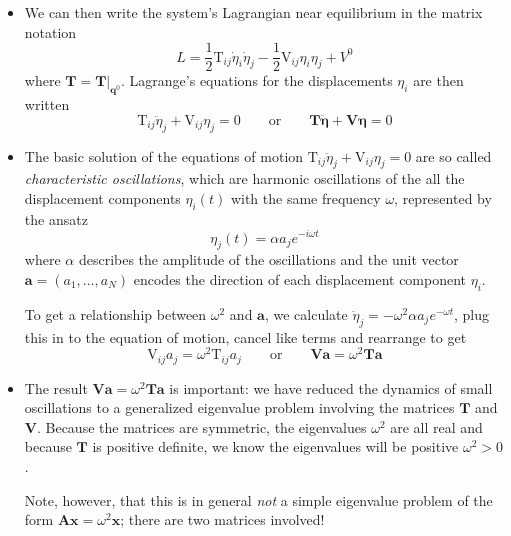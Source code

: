 \documentclass[11pt, a4paper]{article}
\newcommand{\eqtext}[1]{\qquad \text{#1} \qquad}
\newcommand{\bddot}[1]{\ddot{\bm{#1}}}
\newcommand{\mat}[1]{\mathbf{#1}}
\begin{document}
\begin{itemize}
	\item We can then write the system's Lagrangian near equilibrium in the matrix notation
	\begin{equation*}
		L = \frac{1}{2} \mathrm{T}_{ij}\dot{\eta}_{i}\dot{\eta}_{j} - \frac{1}{2}\mathrm{V}_{ij}\eta_{i}\eta_{j} + V^{0}
	\end{equation*}
	where $ \mat{T} = \mat{T}\big |_{\bm{q}^{0}} $. Lagrange's equations for the displacements $ \eta_{i} $ are then written
	\begin{equation*}
		\mathrm{T}_{ij} \ddot{\eta}_{j} + \mathrm{V}_{ij} \eta_{j} = 0 \eqtext{or} \mat{T} \bddot{\eta} + \mat{V} \bm{\eta} =0
	\end{equation*}
	
	\item The basic solution of the equations of motion $ \mathrm{T}_{ij} \ddot{\eta}_{j} + \mathrm{V}_{ij} \eta_{j} = 0 $ are so called \textit{characteristic oscillations}, which are harmonic oscillations of the all the displacement components $ \eta_{i}(t) $ with the same frequency $ \omega $, represented by the ansatz
	\begin{equation*}
		\eta_{j}(t) = \alpha a_{j} e^{-i\omega t}
	\end{equation*}
	where $ \alpha $ describes the amplitude of the oscillations and the unit vector $ \bm{a} = (a_{1}, \ldots, a_{N}) $ encodes the direction of each displacement component $ \eta_{i} $. 
	
	To get a relationship between $ \omega^{2} $ and $ \bm{a} $, we calculate $ \ddot{\eta}_{j} = -\omega^{2}\alpha a_{j}e^{-\omega t}  $, plug this in to the equation of motion, cancel like terms and rearrange to get
	\begin{equation*}
		\mathrm{V}_{ij} a_{j} = \omega^{2}\mathrm{T}_{ij}a_{j} \eqtext{or} \mat{V} \bm{a} = \omega^{2} \mat{T} \bm{a} 
	\end{equation*}

	\item The result $ \mat{V} \bm{a} = \omega^{2} \mat{T} \bm{a}  $ is important: we have reduced the dynamics of small oscillations to a generalized eigenvalue problem involving the matrices $ \mat{T} $ and $ \mat{V} $. Because the matrices are symmetric, the eigenvalues $ \omega^{2} $ are all real and because $ \mat{T} $ is positive definite, we know the eigenvalues will be positive $ \omega^{2} > 0 $.
	

	Note, however, that this is in general \textit{not} a simple eigenvalue problem of the form $ \mat{A} \bm{x} = \omega^{2} \bm{x} $; there are two matrices involved!
	
	
\end{itemize}
\end{document}
